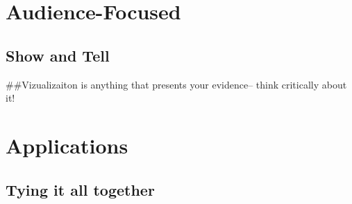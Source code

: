 \documentclass[]{book}
\begin{document}
\hypertarget{audience-focused}{%
\chapter{Audience-Focused}\label{audience-focused}}

\hypertarget{show-and-tell}{%
\section{Show and Tell}\label{show-and-tell}}

\#\#Vizualizaiton is anything that presents your evidence-- think critically about it!

\hypertarget{applications}{%
\chapter{Applications}\label{applications}}

\hypertarget{tying-it-all-together}{%
\section{Tying it all together}\label{tying-it-all-together}}


\end{document}
